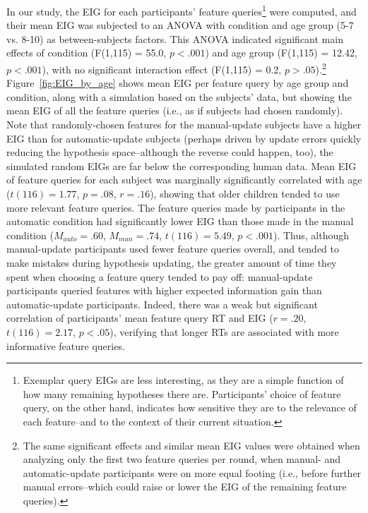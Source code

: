 \documentclass[man,floatsintext]{apa6}
\begin{document}
In our study, the EIG for each participants' feature queries\footnote{Exemplar query EIGs are 
less interesting, as they are a simple function of how many remaining hypotheses 
there are. Participants' choice of feature query, on the other hand, indicates how 
sensitive they are to the relevance of each feature--and to the context of their 
current situation.} were computed, and their mean EIG was 
subjected to an ANOVA with condition and age group (5-7 vs. 8-10) as between-subjects factors. 
This ANOVA indicated significant main effects of condition (F(1,115) = 55.0, $p<.001$) 
and age group (F(1,115) = 12.42, $p<.001$), with no significant interaction effect (F(1,115) = 0.2, $p>.05$).\footnote{The same significant effects and similar mean EIG values were obtained when analyzing only the first two feature queries per round, when manual- and automatic-update participants were on more equal footing (i.e., before further manual errors--which could raise or lower the EIG of the remaining feature queries).}
Figure~\ref{fig:EIG_by_age} shows mean EIG per feature query by age group and condition, along with a simulation based on the subjects' data, but showing the mean EIG of all the feature queries (i.e., as if subjects had chosen randomly). Note that randomly-chosen features for the manual-update subjects have a higher EIG than for automatic-update subjects (perhaps driven by update errors quickly reducing the hypothesis space--although the reverse could happen, too), the simulated random EIGs are far below the corresponding human data.
Mean EIG of feature queries for each subject was marginally significantly correlated with 
age ($t(116)=1.77$, $p=.08$, $r=.16$), showing that older children tended to use more relevant feature queries. 
The feature queries made by participants in the 
automatic condition had significantly lower EIG than those made in the manual 
condition ($M_{auto} = .60$, $M_{man} = .74$, $t(116) = 5.49$,  $p<.001$). Thus, 
although manual-update participants used fewer feature queries overall, and tended 
to make mistakes during hypothesis updating, the greater amount of time they spent 
when choosing a feature query tended to pay off: manual-update participants 
queried features with higher expected information gain than automatic-update 
participants. Indeed, there was a weak but significant correlation of participants' mean feature query RT and EIG ($r=.20$, $t(116)=2.17$, $p<.05$), verifying that longer RTs are associated with more informative feature queries.
\end{document}
